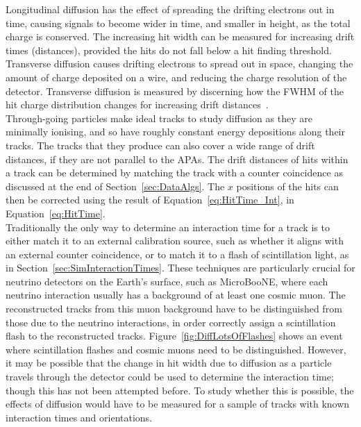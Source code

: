Longitudinal diffusion has the effect of spreading the drifting electrons out in time, causing signals to become wider in time, and smaller in height, as the total charge is conserved. The increasing hit width can be measured for increasing drift times (distances), provided the hits do not fall below a hit finding threshold. Transverse diffusion causes drifting electrons to spread out in space, changing the amount of charge deposited on a wire, and reducing the charge resolution of the detector. Transverse diffusion is measured by discerning how the FWHM of the hit charge distribution changes for increasing drift distances~\citep{Li:2015rqa}. \\

Through-going particles make ideal tracks to study diffusion as they are minimally ionising, and so have roughly constant energy depositions along their tracks. The tracks that they produce can also cover a wide range of drift distances, if they are not parallel to the APAs. The drift distances of hits within a track can be determined by matching the track with a counter coincidence as discussed at the end of Section~\ref{sec:DataAlgs}. The $x$ positions of the hits can then be corrected using the result of Equation~\ref{eq:HitTime_Int}, in Equation~\ref{eq:HitTime}. \\

Traditionally the only way to determine an interaction time for a track is to either match it to an external calibration source, such as whether it aligns with an external counter coincidence, or to match it to a flash of scintillation light, as in Section~\ref{sec:SimInteractionTimes}. These techniques are particularly crucial for neutrino detectors on the Earth's surface, such as MicroBooNE, where each neutrino interaction usually has a background of at least one cosmic muon. The reconstructed tracks from this muon background have to be distinguished from those due to the neutrino interactions, in order correctly assign a scintillation flash to the reconstructed tracks. Figure~\ref{fig:DiffLotsOfFlashes} shows an event where scintillation flashes and cosmic muons need to be distinguished. However, it may be possible that the change in hit width due to diffusion as a particle travels through the detector could be used to determine the interaction time; though this has not been attempted before. To study whether this is possible, the effects of diffusion would have to be measured for a sample of tracks with known interaction times and orientations. \\

